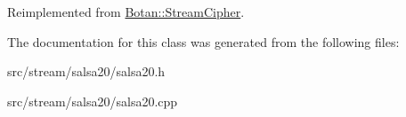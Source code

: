 Reimplemented from \hyperlink{classBotan_1_1StreamCipher_aeb0aaa9c4248e22c8302b99b2dfa9e8d}{Botan\-::\-Stream\-Cipher}.



The documentation for this class was generated from the following files\-:\begin{DoxyCompactItemize}
\item 
src/stream/salsa20/salsa20.\-h\item 
src/stream/salsa20/salsa20.\-cpp\end{DoxyCompactItemize}

